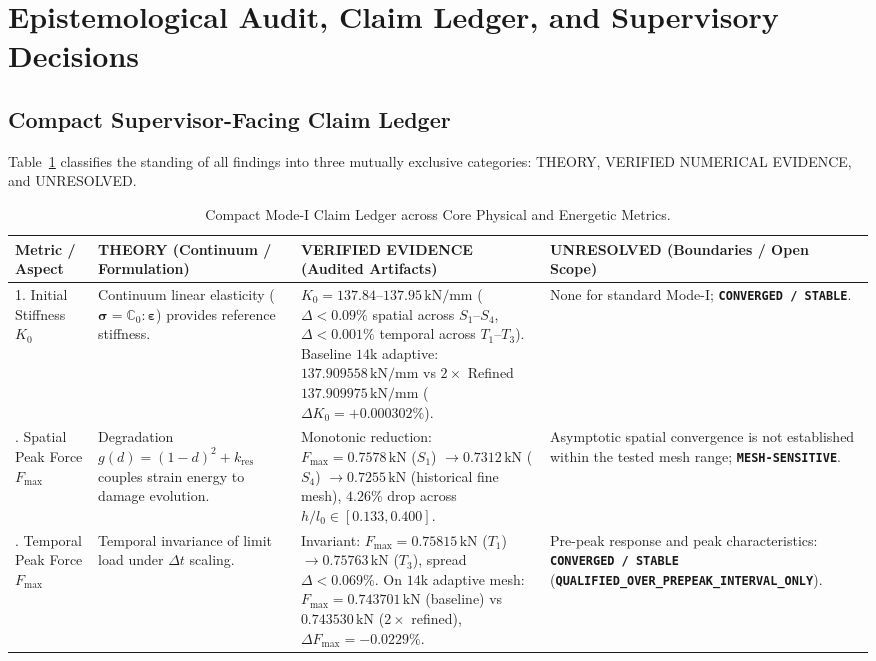 \section{Epistemological Audit, Claim Ledger, and Supervisory Decisions}
\label{sec:epistemological_audit_and_decisions}

\subsection{Compact Supervisor-Facing Claim Ledger}
Table~\ref{tab:claim_ledger_pack} classifies the standing of all findings into three mutually exclusive categories: THEORY, VERIFIED NUMERICAL EVIDENCE, and UNRESOLVED.

\begin{table}[htbp]
\centering
\caption{Compact Mode-I Claim Ledger across Core Physical and Energetic Metrics.}
\label{tab:claim_ledger_pack}
\scriptsize
\setlength{\tabcolsep}{3pt}
\begin{tabularx}{\textwidth}{p{2.2cm}p{3.8cm}p{4.2cm}X}
\toprule
Metric / Aspect & \textbf{THEORY} (Continuum / Formulation) & \textbf{VERIFIED EVIDENCE} (Audited Artifacts) & \textbf{UNRESOLVED} (Boundaries / Open Scope) \\
\midrule
1. Initial Stiffness $K_0$ & Continuum linear elasticity ($\boldsymbol{\sigma} = \mathbb{C}_0 : \boldsymbol{\varepsilon}$) provides reference stiffness. & $K_0 = 137.84$--$137.95\,\mathrm{kN/mm}$ ($\Delta < 0.09\%$ spatial across $S_1$--$S_4$, $\Delta < 0.001\%$ temporal across $T_1$--$T_3$). Baseline $14\mathrm{k}$ adaptive: $137.909558\,\mathrm{kN/mm}$ vs $2\times$ Refined $137.909975\,\mathrm{kN/mm}$ ($\Delta K_0 = +0.000302\%$). & None for standard Mode-I; \textbf{\texttt{CONVERGED / STABLE}}. \\
\addlinespace
2. Spatial Peak Force $F_{\max}$ & Degradation $g(d) = (1-d)^2 + k_{\mathrm{res}}$ couples strain energy to damage evolution. & Monotonic reduction: $F_{\max} = 0.7578\,\mathrm{kN}$ ($S_1$) $\to 0.7312\,\mathrm{kN}$ ($S_4$) $\to 0.7255\,\mathrm{kN}$ (historical fine mesh), $4.26\%$ drop across $h/l_0 \in [0.133, 0.400]$. & Asymptotic spatial convergence is not established within the tested mesh range; \textbf{\texttt{MESH-SENSITIVE}}. \\
\addlinespace
3. Temporal Peak Force $F_{\max}$ & Temporal invariance of limit load under $\Delta t$ scaling. & Invariant: $F_{\max} = 0.75815\,\mathrm{kN}$ ($T_1$) $\to 0.75763\,\mathrm{kN}$ ($T_3$), spread $\Delta < 0.069\%$. On $14\mathrm{k}$ adaptive mesh: $F_{\max} = 0.743701\,\mathrm{kN}$ (baseline) vs $0.743530\,\mathrm{kN}$ ($2\times$ refined), $\Delta F_{\max} = -0.0229\%$. & Pre-peak response and peak characteristics: \textbf{\texttt{CONVERGED / STABLE}} (\textbf{\texttt{QUALIFIED\_OVER\_PREPEAK\_INTERVAL\_ONLY}}). \\

\end{tabularx}
\end{table}
